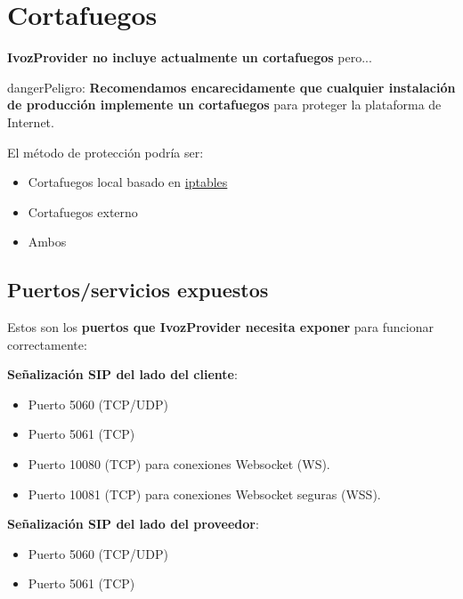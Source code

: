 \documentclass[letterpaper,10pt,spanish]{sphinxmanual}
\begin{document}
\section{Cortafuegos}
\label{security_and_maintenance/security/firewall:firewall}\label{security_and_maintenance/security/firewall::doc}
\textbf{IvozProvider no incluye actualmente un cortafuegos} pero...

\begin{notice}{danger}{Peligro:}
\textbf{Recomendamos encarecidamente que cualquier instalación de producción implemente un cortafuegos} para proteger la plataforma de Internet.
\end{notice}

El método de protección podría ser:
\begin{itemize}
\item {} 
Cortafuegos local basado en \href{https://www.netfilter.org/}{iptables}

\item {} 
Cortafuegos externo

\item {} 
Ambos

\end{itemize}


\subsection{Puertos/servicios expuestos}
\label{security_and_maintenance/security/firewall:exposed-ports-services}
Estos son los \textbf{puertos que IvozProvider necesita exponer} para funcionar correctamente:

\textbf{Señalización SIP del lado del cliente}:
\begin{itemize}
\item {} 
Puerto 5060 (TCP/UDP)

\item {} 
Puerto 5061 (TCP)

\item {} 
Puerto 10080 (TCP) para conexiones Websocket (WS).

\item {} 
Puerto 10081 (TCP) para conexiones Websocket seguras (WSS).

\end{itemize}

\textbf{Señalización SIP del lado del proveedor}:
\begin{itemize}
\item {} 
Puerto 5060 (TCP/UDP)

\item {} 
Puerto 5061 (TCP)

\end{itemize}
\end{document}
